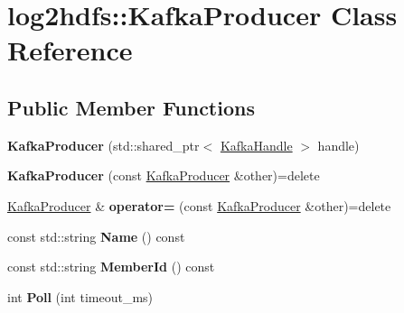\hypertarget{classlog2hdfs_1_1KafkaProducer}{}\section{log2hdfs\+:\+:Kafka\+Producer Class Reference}
\label{classlog2hdfs_1_1KafkaProducer}
\subsection*{Public Member Functions}
\begin{DoxyCompactItemize}
\item 
{\bfseries Kafka\+Producer} (std\+::shared\+\_\+ptr$<$ \hyperlink{classlog2hdfs_1_1KafkaHandle}{Kafka\+Handle} $>$ handle)\hypertarget{classlog2hdfs_1_1KafkaProducer_a998dbc984d6a30d3e551182a565093b9}{}\label{classlog2hdfs_1_1KafkaProducer_a998dbc984d6a30d3e551182a565093b9}

\item 
{\bfseries Kafka\+Producer} (const \hyperlink{classlog2hdfs_1_1KafkaProducer}{Kafka\+Producer} \&other)=delete\hypertarget{classlog2hdfs_1_1KafkaProducer_a1813d60e68fa44730ff7165b5d903c7c}{}\label{classlog2hdfs_1_1KafkaProducer_a1813d60e68fa44730ff7165b5d903c7c}

\item 
\hyperlink{classlog2hdfs_1_1KafkaProducer}{Kafka\+Producer} \& {\bfseries operator=} (const \hyperlink{classlog2hdfs_1_1KafkaProducer}{Kafka\+Producer} \&other)=delete\hypertarget{classlog2hdfs_1_1KafkaProducer_a2bfef7af7b242569b3994272c77ea443}{}\label{classlog2hdfs_1_1KafkaProducer_a2bfef7af7b242569b3994272c77ea443}

\item 
const std\+::string {\bfseries Name} () const \hypertarget{classlog2hdfs_1_1KafkaProducer_a1d267b1f8d22a6828aee18ba3e5f2126}{}\label{classlog2hdfs_1_1KafkaProducer_a1d267b1f8d22a6828aee18ba3e5f2126}

\item 
const std\+::string {\bfseries Member\+Id} () const \hypertarget{classlog2hdfs_1_1KafkaProducer_ad8e755ed23ae4531d09685c30f29147b}{}\label{classlog2hdfs_1_1KafkaProducer_ad8e755ed23ae4531d09685c30f29147b}

\item 
int {\bfseries Poll} (int timeout\+\_\+ms)\hypertarget{classlog2hdfs_1_1KafkaProducer_a6924c5174fb83503d37e8c046fa6dd51}{}\label{classlog2hdfs_1_1KafkaProducer_a6924c5174fb83503d37e8c046fa6dd51}


\end{DoxyCompactItemize}
